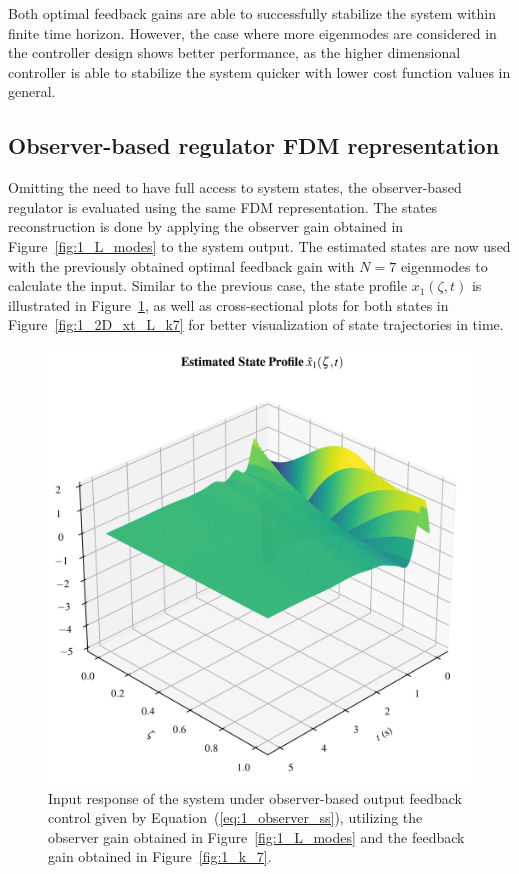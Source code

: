 Both optimal feedback gains are able to successfully stabilize the system within finite time horizon. However, the case where more eigenmodes are considered in the controller design shows better performance, as the higher dimensional controller is able to stabilize the system quicker with lower cost function values in general.

\subsection{Observer-based regulator FDM representation} \label{sec:1_observer}

Omitting the need to have full access to system states, the observer-based regulator is evaluated using the same FDM representation. The states reconstruction is done by applying the observer gain obtained in Figure~\ref{fig:1_L_modes} to the system output. The estimated states are now used with the previously obtained optimal feedback gain with $N=7$ eigenmodes to calculate the input. Similar to the previous case, the state profile $x_1(\zeta,t)$ is illustrated in Figure~\ref{fig:1_3D_x1_L_k7}, as well as cross-sectional plots for both states in Figure~\ref{fig:1_2D_xt_L_k7} for better visualization of state trajectories in time.

\begin{figure}[!htbp]
    \centering
    \includegraphics[width=0.8\textwidth%
    ]{papers/1_optimal/figures/3D_x1_L_k7.png}
    \caption{Input response of the system under observer-based output feedback control given by Equation~(\ref{eq:1_observer_ss}), utilizing the observer gain obtained in Figure~\ref{fig:1_L_modes} and the feedback gain obtained in Figure~\ref{fig:1_k_7}.}
    \label{fig:1_3D_x1_L_k7}
\end{figure}

